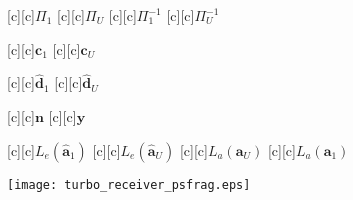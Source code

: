 \documentclass{article}
\begin{document}
\begin{figure}[htb]
  \begin{center}


        [c][c]{\tiny$\Pi_1$}
        [c][c]{\tiny$\Pi_U$}
        [c][c]{\tiny$\Pi_1^{-1}$}
        [c][c]{\tiny$\Pi_U^{-1}$}

        [c][c]{$\mathrm{\mathbf{c}}_1$}
        [c][c]{$\mathrm{\mathbf{c}}_U$}

        [c][c]{$\mathrm{\mathbf{\hat{d}}}_1$}
        [c][c]{$\mathrm{\mathbf{\hat{d}}}_U$}

        [c][c]{$\mathrm{\mathbf{n}}$}
        [c][c]{$\mathrm{\mathbf{y}}$}

        [c][c]{\hspace{4mm}$L_e(\mathrm{\mathbf{\hat{a}}}_1)$}
        [c][c]{\hspace{4mm}$L_e(\mathrm{\mathbf{\hat{a}}}_U)$}
        [c][c]{\hspace{4mm}$L_a(\mathrm{\mathbf{a}}_U)$}
        [c][c]{\hspace{4mm}$L_a(\mathrm{\mathbf{a}}_1)$}


    \texttt{[image: turbo\_receiver\_psfrag.eps]}
    \end{center}
\end{figure}
\end{document}
